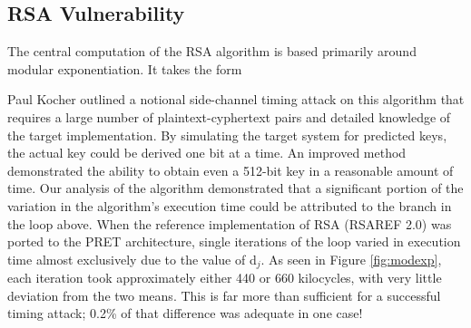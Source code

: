 \documentclass[times, 10pt,twocolumn]{article}
\begin{document}
\subsection{RSA Vulnerability}
The central computation of the RSA algorithm is based primarily around modular exponentiation.  It takes the form 

\begin{center}\end{center}

Paul Kocher outlined\cite{Kocher96timingattacks} a notional side-channel timing attack on this algorithm that requires a large number of plaintext-cyphertext pairs and detailed knowledge of the target implementation.  By simulating the target system for predicted keys, the actual key could be derived one bit at a time.  An improved method \cite{DKLMQW98} demonstrated the ability to obtain even a 512-bit key in a reasonable amount of time.  Our analysis of the algorithm demonstrated that a significant portion of the variation in the algorithm's execution time could be attributed to the branch in the loop above.  When the reference implementation of RSA (RSAREF 2.0) was ported to the PRET architecture, single iterations of the loop varied in execution time almost exclusively due to the value of d$_{j}$.  As seen in Figure \ref{fig:modexp}, each iteration took approximately either 440 or 660 kilocycles, with very little deviation from the two means.  This is far more than sufficient for a successful timing attack; 0.2\% of that difference was adequate in one case! \cite{DKLMQW98}
\end{document}
